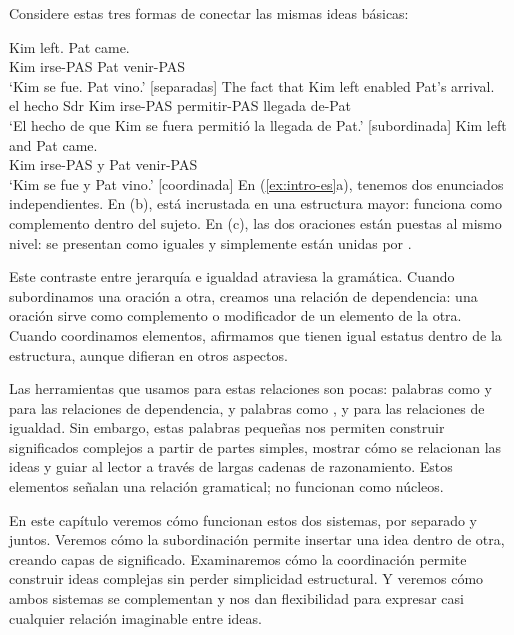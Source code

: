 Considere estas tres formas de conectar las mismas ideas básicas:

\ea \label{ex:intro-es}
    \ea \gll Kim left. Pat came.\\
        Kim irse-PAS Pat venir-PAS\\
    \glt `Kim se fue. Pat vino.' [separadas]
    \ex \gll The fact {\ob}that Kim left{\cb} enabled Pat's arrival.\\
        el hecho Sdr Kim irse-PAS permitir-PAS llegada de-Pat\\
    \glt `El hecho de que Kim se fuera permitió la llegada de Pat.' [subordinada]
    \ex \gll Kim left and Pat came.\\
        Kim irse-PAS y Pat venir-PAS\\
    \glt `Kim se fue y Pat vino.' [coordinada]
    \z
\z
En (\ref{ex:intro-es}a), tenemos dos enunciados independientes. En (b),  está incrustada en una estructura mayor: funciona como complemento dentro del sujeto. En (c), las dos oraciones están puestas al mismo nivel: se presentan como iguales y simplemente están unidas por .

Este contraste entre jerarquía e igualdad atraviesa la gramática. Cuando subordinamos una oración a otra, creamos una relación de dependencia: una oración sirve como complemento o modificador de un elemento de la otra. Cuando coordinamos elementos, afirmamos que tienen igual estatus dentro de la estructura, aunque difieran en otros aspectos.

Las herramientas que usamos para estas relaciones son pocas: palabras como  y  para las relaciones de dependencia, y palabras como ,  y  para las relaciones de igualdad. Sin embargo, estas palabras pequeñas nos permiten construir significados complejos a partir de partes simples, mostrar cómo se relacionan las ideas y guiar al lector a través de largas cadenas de razonamiento. Estos elementos señalan una relación gramatical; no funcionan como núcleos.

En este capítulo veremos cómo funcionan estos dos sistemas, por separado y juntos. Veremos cómo la subordinación permite insertar una idea dentro de otra, creando capas de significado. Examinaremos cómo la coordinación permite construir ideas complejas sin perder simplicidad estructural. Y veremos cómo ambos sistemas se complementan y nos dan flexibilidad para expresar casi cualquier relación imaginable entre ideas.

